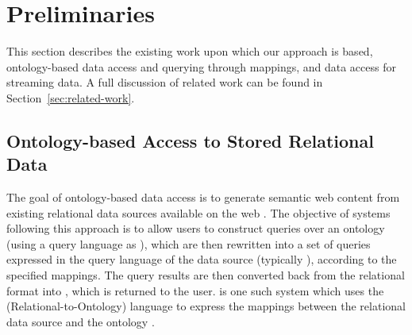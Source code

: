
\section{Preliminaries}
\label{sec:background}

This section describes the existing work upon which our approach is based, \ie ontology-based data access and querying through mappings, and data access for streaming data.
A full discussion of related work can be found in Section~\ref{sec:related-work}.


\subsection{Ontology-based Access to Stored Relational Data}
\label{sec:ontol-based-access-stored}

The goal of ontology-based data access is to generate semantic web content from existing relational data sources available on the web \cite{Sahoo_09}.
The objective of systems following this approach is to allow users to construct queries over an ontology (\eg using a query language as \sparql), which are then rewritten into a set of queries expressed in the query language of the data source (typically \sql), according to the specified mappings.
The query results are then converted back from the relational format into \rdf, which is returned to the user.
\odemapster is one such system which uses the \rtwoo (Relational-to-Ontology) language to express the mappings between the relational data source and the ontology \cite{Barrasa_04}.

